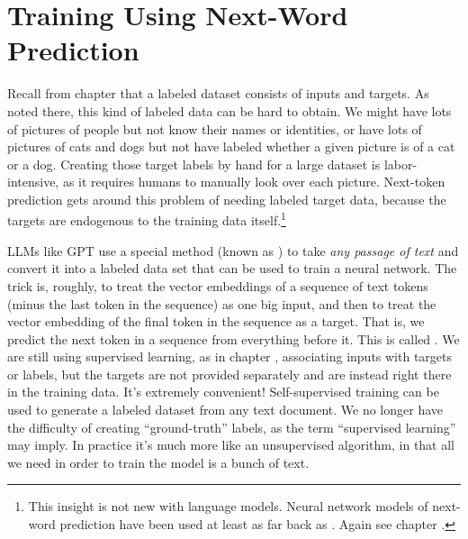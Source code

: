 \section{Training Using Next-Word Prediction}

Recall from chapter  that a labeled dataset consists of
inputs and targets. As noted there, this kind of labeled data can be hard to
obtain. We might have lots of pictures of people but not know their names or
identities, or have lots of pictures of cats and dogs but not have labeled
whether a given picture is of a cat or a dog. Creating those target labels by
hand for a large dataset is labor-intensive, as it requires humans to manually
look over each picture. Next-token prediction gets around this problem of needing labeled target data, because the 
targets are endogenous to the training data itself.\footnote{This insight is not new with language models. Neural network models of next-word prediction have been used at least as far back as \cite{elman1990finding}. Again see chapter . }

LLMs like GPT use a special method (known as ) to
take \emph{any passage of text} and convert it into a labeled data set that can
be used to train a neural network. The trick is, roughly, to treat the vector
embeddings of a sequence of text tokens (minus the last token in the sequence)
as one big input, and then to treat the vector embedding of the final token in
the sequence as a target. That is, we predict the next token in a sequence from everything before it.
 This is called .
We are still using supervised learning, as in chapter ,
associating inputs with targets or labels, but the targets are not provided
separately and are instead right there in the training data. It's extremely
convenient! Self-supervised training can be used to generate a labeled dataset
from any text document. We no longer have the difficulty of creating
``ground-truth'' labels, as the term ``supervised learning'' may imply. In
practice it's much more like an unsupervised algorithm, in that all we need in
order to train the model is a bunch of text.


